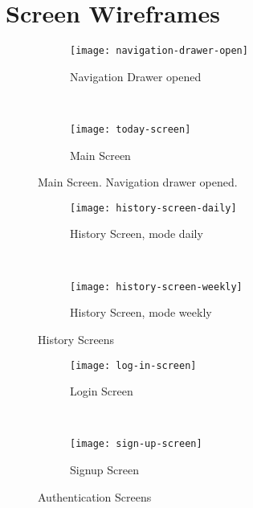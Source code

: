 \chapter{Screen Wireframes}
\label{chapter:screen-wireframes}

\begin{figure*}[ht]
    \centering
    \begin{subfigure}[t]{0.4\textwidth}
        \centering
        \texttt{[image: navigation-drawer-open]}
        \caption{Navigation Drawer opened}
    \end{subfigure}%
    ~ 
    \begin{subfigure}[t]{0.4\textwidth}
        \centering
        \texttt{[image: today-screen]}
        \caption{Main Screen}
    \end{subfigure}
    \caption{Main Screen. Navigation drawer opened.}
\end{figure*}



\begin{figure*}[ht]
    \centering
    \begin{subfigure}[t]{0.4\textwidth}
        \centering
        \texttt{[image: history-screen-daily]}
        \caption{History Screen, mode daily}
    \end{subfigure}%
    ~ 
    \begin{subfigure}[t]{0.4\textwidth}
        \centering
        \texttt{[image: history-screen-weekly]}
        \caption{History Screen, mode weekly}
    \end{subfigure}
    \caption{History Screens}
\end{figure*}



\begin{figure*}[ht]
    \centering
    \begin{subfigure}[t]{0.4\textwidth}
        \centering
        \texttt{[image: log-in-screen]}
        \caption{Login Screen}
    \end{subfigure}%
    ~ 
    \begin{subfigure}[t]{0.4\textwidth}
        \centering
        \texttt{[image: sign-up-screen]}
        \caption{Signup Screen}
    \end{subfigure}
    \caption{Authentication Screens}
\end{figure*}



